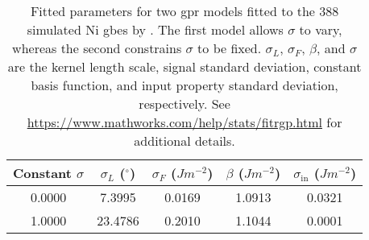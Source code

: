 \begin{table}
\centering
\caption{Fitted parameters for two \gls{gpr} models fitted to the 388 simulated Ni \glspl{gbe} by \citet{olmstedSurveyComputedGrain2009a}. The first model allows $\sigma$ to vary, whereas the second constrains $\sigma$ to be fixed. $\sigma_L$, $\sigma_F$, $\beta$, and $\sigma$ are the kernel length scale, signal standard deviation, constant basis function, and input property standard deviation, respectively. See \url{https://www.mathworks.com/help/stats/fitrgp.html} for additional details.}
\label{table:resubloss-ni-pars}
\begin{tabular}{ccccc}
\toprule
Constant $\sigma$ & $\sigma_L$ ($^\circ{}$) & $\sigma_F$ ($J m^{-2}$) & $\beta$ ($J m^{-2}$) & $\sigma_\mathrm{in}$ ($J m^{-2}$) \\
\midrule
0.0000 & 7.3995 & 0.0169 & 1.0913 & 0.0321 \\
1.0000 & 23.4786 & 0.2010 & 1.1044 & 0.0001 \\
\bottomrule
\end{tabular}
\label{table:resubloss-ni-pars}
\end{table}